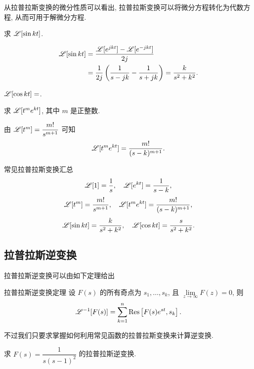 从拉普拉斯变换的微分性质可以看出, 拉普拉斯变换可以将微分方程转化为代数方程, 从而可用于解微分方程.

\begin{example}
	求 $\mathscr{L}[\sin{kt}]$.
\end{example}

\begin{solution}
	\begin{align*}
		\mathscr{L}[\sin{kt}]&=\frac{\mathscr{L}[e^{jkt}]-\mathscr{L}[e^{-jkt}]}{2j}\\
		&=\frac1{2j}\left(\frac1{s-jk}-\frac1{s+jk}\right)
			=\frac k{s^2+k^2}.
	\end{align*}
\end{solution}

\begin{exercise}
	$\mathscr{L}[\cos{kt}]=$.
\end{exercise}

\begin{example}
	求 $\mathscr{L}[t^me^{kt}]$, 其中 $m$ 是正整数.
\end{example}

\begin{solution}
	由 $\mathscr{L}[t^m]=\dfrac{m!}{s^{m+1}}$ 可知
	\[\mathscr{L}[t^me^{kt}]=\frac{m!}{(s-k)^{m+1}}.\]
\end{solution}

\begin{second}{常见拉普拉斯变换汇总}
	\[\mathscr{L}[1]=\frac1s,\quad \mathscr{L}[e^{kt}]=\frac1{s-k},\]
	\[\mathscr{L}[t^m]=\frac{m!}{s^{m+1}},\quad \mathscr{L}[t^me^{kt}]=\frac{m!}{(s-k)^{m+1}},\]
	\[\mathscr{L}[\sin kt]=\frac{k}{s^2+k^2},\quad
	\mathscr{L}[\cos kt]=\frac{s}{s^2+k^2}.\]
\end{second}

\subsection{拉普拉斯逆变换}

拉普拉斯逆变换可以由如下定理给出
\begin{main}{拉普拉斯逆变换定理}
	设 $F(s)$ 的所有奇点为 $s_1,\dots,s_k$, 且 $\lim\limits_{z\to\infty}F(z)=0$, 则
	\[\mathscr{L}^{-1}[F(s)]=\sum_{k=1}^n {\mathrm{Res}}\left[F(s)e^{st},s_k\right].\]
\end{main}

不过我们只要求掌握如何利用常见函数的拉普拉斯变换来计算逆变换.

\begin{example}
	求 $F(s)=\dfrac1{s(s-1)^2}$ 的拉普拉斯逆变换.
\end{example}

